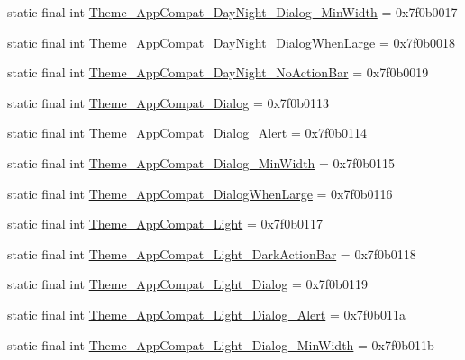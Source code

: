 \begin{CompactItemize}
\item 
static final int \hyperlink{classandroid_1_1support_1_1v7_1_1mediarouter_1_1_r_1_1style_5f2d0133ab1da609027640e81959e46f}{Theme\_\-AppCompat\_\-DayNight\_\-Dialog\_\-MinWidth} = 0x7f0b0017
\item 
static final int \hyperlink{classandroid_1_1support_1_1v7_1_1mediarouter_1_1_r_1_1style_27d100e103d7e23751f1793299649721}{Theme\_\-AppCompat\_\-DayNight\_\-DialogWhenLarge} = 0x7f0b0018
\item 
static final int \hyperlink{classandroid_1_1support_1_1v7_1_1mediarouter_1_1_r_1_1style_8fd0089ed38af1e39e6da743457a0ac6}{Theme\_\-AppCompat\_\-DayNight\_\-NoActionBar} = 0x7f0b0019
\item 
static final int \hyperlink{classandroid_1_1support_1_1v7_1_1mediarouter_1_1_r_1_1style_462fc97eca5f8f7d1be7e8d0f02a77da}{Theme\_\-AppCompat\_\-Dialog} = 0x7f0b0113
\item 
static final int \hyperlink{classandroid_1_1support_1_1v7_1_1mediarouter_1_1_r_1_1style_559517b732de056b932930c45d7edfc5}{Theme\_\-AppCompat\_\-Dialog\_\-Alert} = 0x7f0b0114
\item 
static final int \hyperlink{classandroid_1_1support_1_1v7_1_1mediarouter_1_1_r_1_1style_f07f445d93455abe19ce5db199908f1b}{Theme\_\-AppCompat\_\-Dialog\_\-MinWidth} = 0x7f0b0115
\item 
static final int \hyperlink{classandroid_1_1support_1_1v7_1_1mediarouter_1_1_r_1_1style_ba43a1f471e0c68b918b1bd69a6e4f4c}{Theme\_\-AppCompat\_\-DialogWhenLarge} = 0x7f0b0116
\item 
static final int \hyperlink{classandroid_1_1support_1_1v7_1_1mediarouter_1_1_r_1_1style_a08fb3254af00c20f306ad06491db47f}{Theme\_\-AppCompat\_\-Light} = 0x7f0b0117
\item 
static final int \hyperlink{classandroid_1_1support_1_1v7_1_1mediarouter_1_1_r_1_1style_a3c8e8b1ff28f46d9a38d9bf6df2fa5d}{Theme\_\-AppCompat\_\-Light\_\-DarkActionBar} = 0x7f0b0118
\item 
static final int \hyperlink{classandroid_1_1support_1_1v7_1_1mediarouter_1_1_r_1_1style_e3498783186bcbcd522c0533edc54d66}{Theme\_\-AppCompat\_\-Light\_\-Dialog} = 0x7f0b0119
\item 
static final int \hyperlink{classandroid_1_1support_1_1v7_1_1mediarouter_1_1_r_1_1style_394d4f995590ef73e47a55fcba924d67}{Theme\_\-AppCompat\_\-Light\_\-Dialog\_\-Alert} = 0x7f0b011a
\item 
static final int \hyperlink{classandroid_1_1support_1_1v7_1_1mediarouter_1_1_r_1_1style_0fec5b3d351728ad5dbfbc4172b17f30}{Theme\_\-AppCompat\_\-Light\_\-Dialog\_\-MinWidth} = 0x7f0b011b

\end{CompactItemize}
